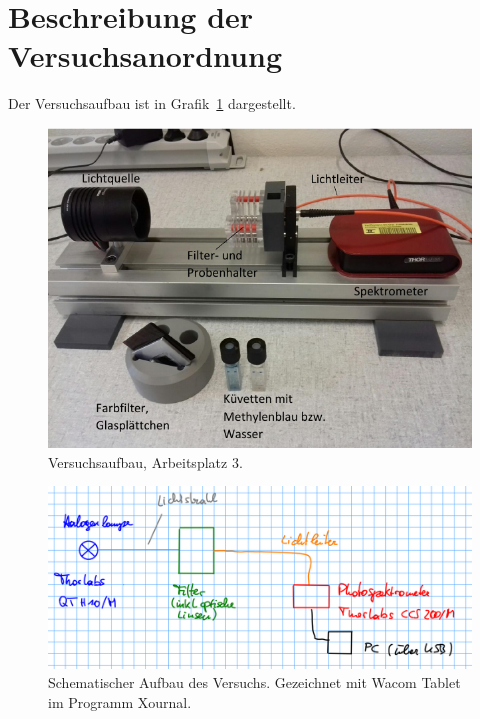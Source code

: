 \documentclass{article}
\begin{document}
\section{Beschreibung der Versuchsanordnung}

Der Versuchsaufbau ist in Grafik~\ref{fig:aufbau} dargestellt.

\begin{figure}[H]
\caption{Versuchsaufbau, Arbeitsplatz 3.}
\label{fig:aufbau}
\includegraphics[scale=1.4]{aufbau.png}
\end{figure}


\begin{figure}[H]
\caption{Schematischer Aufbau des Versuchs. Gezeichnet mit Wacom Tablet im Programm Xournal.}
\label{fig:aufbau2}
\includegraphics[scale=1.]{aufbau2.png}
\end{figure}
\end{document}
